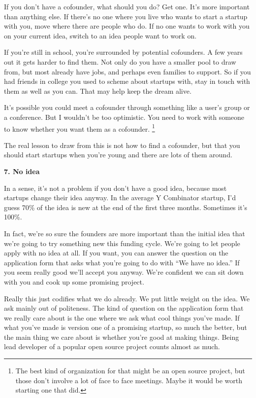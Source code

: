 If you don't have a cofounder, what should you do? Get one. It's more
important than anything else. If there's no one where you live who wants
to start a startup with you, move where there are people who do. If no
one wants to work with you on your current idea, switch to an idea
people want to work on.

If you're still in school, you're surrounded by potential cofounders. A
few years out it gets harder to find them. Not only do you have a
smaller pool to draw from, but most already have jobs, and perhaps even
families to support. So if you had friends in college you used to scheme
about startups with, stay in touch with them as well as you can. That
may help keep the dream alive.

It's possible you could meet a cofounder through something like a user's
group or a conference. But I wouldn't be too optimistic. You need to
work with someone to know whether you want them as a cofounder.
\footnote{The best kind of organization for that might be an open source
project, but those don't involve a lot of face to face meetings. Maybe
it would be worth starting one that did.}

The real lesson to draw from this is not how to find a cofounder, but
that you should start startups when you're young and there are lots of
them around.

\textbf{7. No idea}

In a sense, it's not a problem if you don't have a good idea, because
most startups change their idea anyway. In the average Y Combinator
startup, I'd guess 70\% of the idea is new at the end of the first three
months. Sometimes it's 100\%.

In fact, we're so sure the founders are more important than the initial
idea that we're going to try something new this funding cycle. We're
going to let people apply with no idea at all. If you want, you can
answer the question on the application form that asks what you're going
to do with ``We have no idea.'' If you seem really good we'll accept you
anyway. We're confident we can sit down with you and cook up some
promising project.

Really this just codifies what we do already. We put little weight on
the idea. We ask mainly out of politeness. The kind of question on the
application form that we really care about is the one where we ask what
cool things you've made. If what you've made is version one of a
promising startup, so much the better, but the main thing we care about
is whether you're good at making things. Being lead developer of a
popular open source project counts almost as much.

